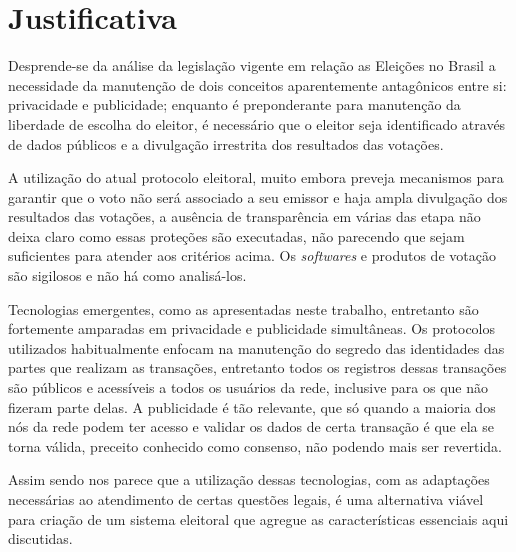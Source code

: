 \chapter{Justificativa}
Desprende-se da análise da legislação vigente em relação as Eleições no Brasil a necessidade da manutenção de dois conceitos aparentemente antagônicos entre si: privacidade e publicidade; enquanto é preponderante para manutenção da liberdade de escolha do eleitor, é necessário que o eleitor seja identificado através de dados públicos e a divulgação irrestrita dos resultados das votações. 

A utilização do atual protocolo eleitoral, muito embora preveja mecanismos para garantir que o voto não será associado a seu emissor e haja ampla divulgação dos resultados das votações, a ausência de transparência em várias das etapa não deixa claro como essas proteções são executadas, não parecendo que sejam suficientes para atender aos critérios acima. Os \textit{softwares} e produtos de votação são sigilosos e não há como analisá-los. 

Tecnologias emergentes, como as apresentadas neste trabalho, entretanto são fortemente amparadas em privacidade e publicidade simultâneas. Os protocolos utilizados habitualmente enfocam na manutenção do segredo das identidades das partes que realizam as transações, entretanto todos os registros dessas transações são públicos e acessíveis a todos os usuários da rede, inclusive para os que não fizeram parte delas. A publicidade é tão relevante, que só quando a maioria dos nós da rede podem ter acesso e validar os dados de certa transação é que ela se torna válida, preceito conhecido como consenso, não podendo mais ser revertida. 

Assim sendo nos parece que a utilização dessas tecnologias, com as adaptações necessárias ao atendimento de certas questões legais, é uma alternativa viável para criação de um sistema eleitoral que agregue as características essenciais aqui discutidas. 
